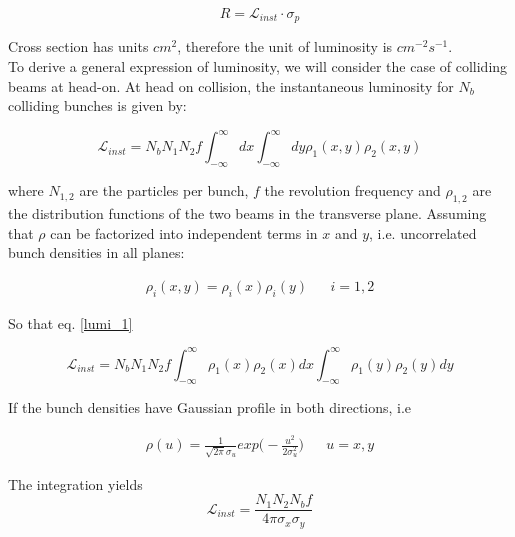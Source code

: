 \begin{equation}
R=\mathcal{L}_{inst} \cdot \sigma_{p}
\end{equation}

Cross section has units $cm^{2}$, therefore the unit of luminosity is $cm^{-2}s^{-1}$.\\
To derive a general expression of luminosity, we will consider the case of colliding beams at head-on.
At head on collision, the instantaneous luminosity for $N_{b}$ colliding bunches is given by:

\begin{equation}
  \mathcal{L}_{inst}= N_{b} N_{1}N_{2}f \int_{-\infty}^{\infty} dx\int_{-\infty}^{\infty} dy \rho_{1}(x,y)\rho_{2}(x,y)
    \label{lumi_1}
\end{equation}

where $N_{1,2}$ are the particles per bunch, $f$ the revolution frequency and $\rho_{1,2}$ are the distribution functions of the two beams in the transverse plane. Assuming that $\rho$ can be factorized into independent terms in $x$ and $y$, i.e. uncorrelated bunch densities in all planes:

\begin{eqnarray}
  \rho_{i}(x,y)= \rho_{i}(x)\rho_{i}(y) & &i=1,2
\end{eqnarray}

So that eq. \ref{lumi_1}

\begin{equation}
  \mathcal{L}_{inst}= N_{b} N_{1}N_{2}f \int_{-\infty}^{\infty}\rho_{1}(x)\rho_{2}(x)  dx\int_{-\infty}^{\infty}\rho_{1}(y)\rho_{2}(y) dy
    \label{lumi_2}
\end{equation}

If the bunch densities have Gaussian profile in both directions, i.e 

\begin{eqnarray}
\rho(u)= \frac{1}{\sqrt{2\pi} \sigma_{u}} exp \biggl(-\frac{u^{2}}{2\sigma_{u}^{2}} \biggr)&  &  u=x,y
\end{eqnarray}

The integration yields
\begin{equation}
  \mathcal{L}_{inst}= \frac{N_{1} N_{2} N_{b}f }{4\pi \sigma_{x} \sigma_{y}}
  \label{lumi_theor}
\end{equation}


